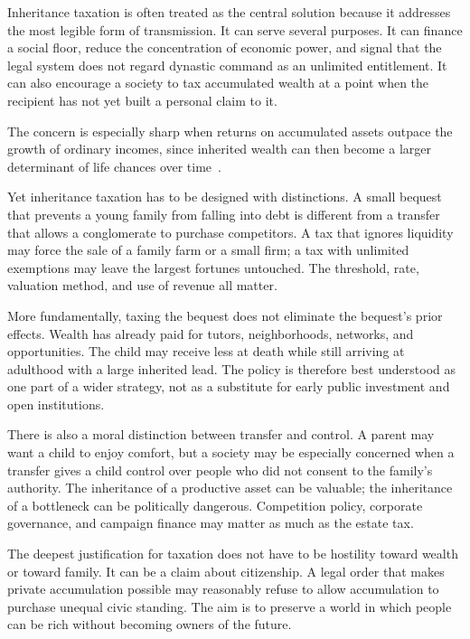 ﻿\documentclass[12pt,a4paper]{book}
\begin{document}
Inheritance taxation is often treated as the central solution because it
addresses the most legible form of transmission.  It can serve several
purposes.  It can finance a social floor, reduce the concentration of
economic power, and signal that the legal system does not regard dynastic
command as an unlimited entitlement.  It can also encourage a society to
tax accumulated wealth at a point when the recipient has not yet built a
personal claim to it.

The concern is especially sharp when returns on accumulated assets outpace
the growth of ordinary incomes, since inherited wealth can then become a
larger determinant of life chances over time~\cite{Piketty2014}.

Yet inheritance taxation has to be designed with distinctions.  A small
bequest that prevents a young family from falling into debt is different
from a transfer that allows a conglomerate to purchase competitors.  A tax
that ignores liquidity may force the sale of a family farm or a small firm;
a tax with unlimited exemptions may leave the largest fortunes untouched.
The threshold, rate, valuation method, and use of revenue all matter.

More fundamentally, taxing the bequest does not eliminate the bequest's
prior effects.  Wealth has already paid for tutors, neighborhoods, networks,
and opportunities.  The child may receive less at death while still
arriving at adulthood with a large inherited lead.  The policy is therefore
best understood as one part of a wider strategy, not as a substitute for
early public investment and open institutions.

There is also a moral distinction between transfer and control.  A parent
may want a child to enjoy comfort, but a society may be especially concerned
when a transfer gives a child control over people who did not consent to the
family's authority.  The inheritance of a productive asset can be valuable;
the inheritance of a bottleneck can be politically dangerous.  Competition
policy, corporate governance, and campaign finance may matter as much as the
estate tax.

The deepest justification for taxation does not have to be hostility toward
wealth or toward family.  It can be a claim about citizenship.  A legal order
that makes private accumulation possible may reasonably refuse to allow
accumulation to purchase unequal civic standing.  The aim is to preserve a
world in which people can be rich without becoming owners of the future.
\end{document}
